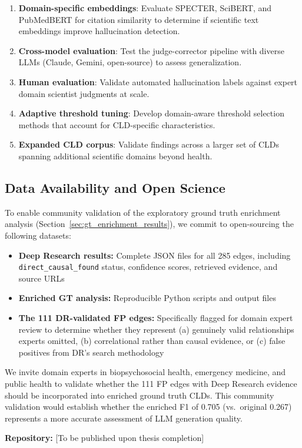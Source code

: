 \begin{enumerate}[noitemsep]
    \item \textbf{Domain-specific embeddings}: Evaluate SPECTER, SciBERT, and PubMedBERT for citation similarity to determine if scientific text embeddings improve hallucination detection.
    \item \textbf{Cross-model evaluation}: Test the judge-corrector pipeline with diverse LLMs (Claude, Gemini, open-source) to assess generalization.
    \item \textbf{Human evaluation}: Validate automated hallucination labels against expert domain scientist judgments at scale.
    \item \textbf{Adaptive threshold tuning}: Develop domain-aware threshold selection methods that account for CLD-specific characteristics.
    \item \textbf{Expanded CLD corpus}: Validate findings across a larger set of CLDs spanning additional scientific domains beyond health.
\end{enumerate}

\subsection{Data Availability and Open Science}

To enable community validation of the exploratory ground truth enrichment analysis (Section~\ref{sec:gt_enrichment_results}), we commit to open-sourcing the following datasets:

\begin{itemize}[noitemsep]
    \item \textbf{Deep Research results:} Complete JSON files for all 285 edges, including \texttt{direct\_causal\_found} status, confidence scores, retrieved evidence, and source URLs
    \item \textbf{Enriched GT analysis:} Reproducible Python scripts and output files
    \item \textbf{The 111 DR-validated FP edges:} Specifically flagged for domain expert review to determine whether they represent (a) genuinely valid relationships experts omitted, (b) correlational rather than causal evidence, or (c) false positives from DR's search methodology
\end{itemize}

We invite domain experts in biopsychosocial health, emergency medicine, and public health to validate whether the 111 FP edges with Deep Research evidence should be incorporated into enriched ground truth CLDs. This community validation would establish whether the enriched F1 of 0.705 (vs.\ original 0.267) represents a more accurate assessment of LLM generation quality.

\textbf{Repository:} [To be published upon thesis completion]







